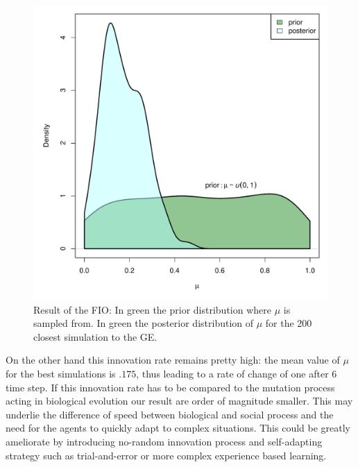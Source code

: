 \documentclass[a1paper,fontscale=.47]{baposter}
\begin{document}
\begin{poster}
{\begin{figure}[H]
	\centering
		\includegraphics[width=.8\textwidth]{img/ABC.pdf} 
		\vspace{-1cm}
		\caption{\small Result of the FIO: In green the prior distribution where $\mu$ is sampled from. In green the posterior distribution of $\mu$ for the $200$ closest simulation  to the GE. }
		\label{fig:abc}
\end{figure}

On the other hand this innovation rate remains pretty high: the mean value of $\mu$ for the best simulations is $.175$, thus leading to a rate of change of one after 6 time step. If this innovation rate has to be compared to the mutation process acting in biological evolution our result are order of magnitude smaller. This may underlie the difference of speed between biological and social process and the need for the agents to quickly adapt to complex situations.  This could be greatly ameliorate by introducing no-random innovation process and self-adapting strategy such as trial-and-error or more complex experience based learning.

}


\end{poster}
\end{document}
